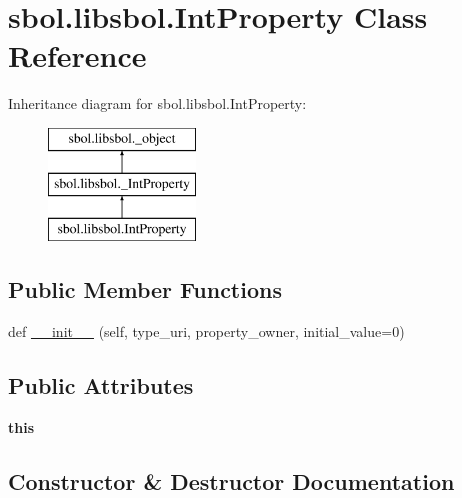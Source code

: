 \hypertarget{classsbol_1_1libsbol_1_1_int_property}{}\section{sbol.\+libsbol.\+Int\+Property Class Reference}
\label{classsbol_1_1libsbol_1_1_int_property}
Inheritance diagram for sbol.\+libsbol.\+Int\+Property\+:\begin{figure}[H]
\begin{center}
\leavevmode
\includegraphics[height=3.000000cm]{classsbol_1_1libsbol_1_1_int_property}
\end{center}
\end{figure}
\subsection*{Public Member Functions}
\begin{DoxyCompactItemize}
\item 
def \hyperlink{classsbol_1_1libsbol_1_1_int_property_ac7205486fd84370791340cbef97adfc4}{\+\_\+\+\_\+init\+\_\+\+\_\+} (self, type\+\_\+uri, property\+\_\+owner, initial\+\_\+value=0)
\end{DoxyCompactItemize}
\subsection*{Public Attributes}
\begin{DoxyCompactItemize}
\item 
{\bfseries this}\hypertarget{classsbol_1_1libsbol_1_1_int_property_a2476b79229067f72732b3279f66bef96}{}\label{classsbol_1_1libsbol_1_1_int_property_a2476b79229067f72732b3279f66bef96}

\end{DoxyCompactItemize}


\subsection{Constructor \& Destructor Documentation}
